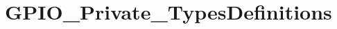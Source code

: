\hypertarget{group___g_p_i_o___private___types_definitions}{}\section{G\+P\+I\+O\+\_\+\+Private\+\_\+\+Types\+Definitions}
\label{group___g_p_i_o___private___types_definitions}
